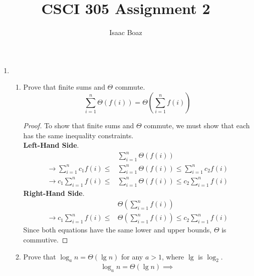 \documentclass{article}
\title{CSCI 305 Assignment 2}
\author{Isaac Boaz}
\begin{document}
\maketitle

\begin{enumerate}
    \item  \begin{enumerate}[label=\arabic*.]
              \item Prove that finite sums and $\Theta$ commute.
                    \begin{equation*}
                        \sum_{i=1}^{n}{\Theta(f(i))} = \Theta(\sum_{i=1}^{n}{f(i)})
                    \end{equation*}
                    \begin{proof}
                        To show that finite sums and $\Theta$ commute, we must show that each has the same inequality constraints. \\[1em]
                        \textbf{Left-Hand Side}.
                        \begin{align*}
                                                                     & \sum_{i=1}^{n}{\Theta(f(i))}                              \\
                            \rightarrow \sum_{i=1}^{n}{c_1f(i)} \leq & \sum_{i=1}^{n}{\Theta(f(i))} \leq \sum_{i=1}^{n}{c_2f(i)} \\
                            \rightarrow c_1\sum_{i=1}^{n}{f(i)} \leq & \sum_{i=1}^{n}{\Theta(f(i))} \leq c_2\sum_{i=1}^{n}{f(i)}
                        \end{align*}
                        \textbf{Right-Hand Side}.
                        \begin{align*}
                                                                     & \Theta(\sum_{i=1}^{n}{f(i)})                              \\
                            \rightarrow c_1\sum_{i=1}^{n}{f(i)} \leq & \Theta(\sum_{i=1}^{n}{f(i)}) \leq c_2\sum_{i=1}^{n}{f(i)}
                        \end{align*}
                        Since both equations have the same lower and upper bounds, $\Theta$ is commutive.
                    \end{proof}
              \item Prove that \(\log_an = \Theta(\lg n)\) for any \(a > 1\), where \(\lg\) is \(\log_2\).
                    \begin{align*}
                        \log_an = \Theta(\lg n) \implies                          \\

\end{align*}
\end{enumerate}
\end{enumerate}
\end{document}
